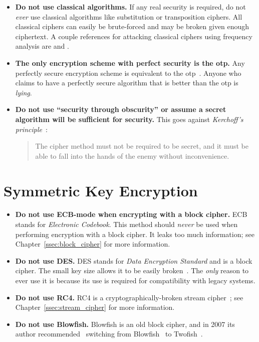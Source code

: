 \begin{itemize}
\item \textbf{Do not use classical algorithms.}
    If any real security is required, do not \emph{ever} use
    classical algorithms like substitution or transposition ciphers.
    All classical ciphers can easily be brute-forced and may
    be broken given enough ciphertext.
    A couple references for attacking classical ciphers using
    frequency analysis are
    \cite[Chapter 1.3]{IntroModernCrypto}
    and \cite[Chapter 1.1]{IntroMathCrypto}.

\item \textbf{The only \gls{encryption scheme} with \gls{perfect security}
    is the \gls{otp}.}
    Any perfectly secure encryption scheme is equivalent to the
    \gls{otp}~\cite[Theorems 2.10 and 2.11]{IntroModernCrypto}.
    Anyone who claims to have a perfectly secure algorithm
    that is better than the \gls{otp} is \emph{lying}.

\item \textbf{Do not use ``security through obscurity'' or
    assume a secret algorithm will be sufficient for security.}
    This goes against
    \emph{Kerchoff's principle}~\cite[Page 5]{IntroModernCrypto}:

\begin{quote}
    The cipher method must not be required to be secret,
    and it must be able to fall into the hands of the enemy
    without inconvenience.
\end{quote}

\end{itemize}

\section{Symmetric Key Encryption}

\begin{itemize}
\item \textbf{Do not use ECB-mode when encrypting with a \gls{block cipher}.}
    ECB stands for \emph{Electronic Codebook}.
    This method should \emph{never} be used when performing
    encryption with a \gls{block cipher}.
    It leaks too much information; see Chapter~\ref{ssec:block_cipher}
    for more information.
\item \textbf{Do not use DES.}
    DES stands for \emph{Data Encryption Standard} and is a \gls{block cipher}.
    The small key size allows it to be easily broken~\cite{rfc4772}.
    The \emph{only} reason to ever use it is because its use is required
    for compatibility with legacy systems.
\item \textbf{Do not use RC4.}
    RC4 is a cryptographically-broken \gls{stream cipher}~\cite{rfc7465};
    see Chapter~\ref{ssec:stream_cipher} for more information.
\item \textbf{Do not use Blowfish.}
    Blowfish is an old \gls{block cipher},
    and in 2007 its author recommended~\cite{SchneierNews2007}
    switching from Blowfish~\cite{BlowfishAlg} to Twofish~\cite{TwofishAlg}.
\end{itemize}

